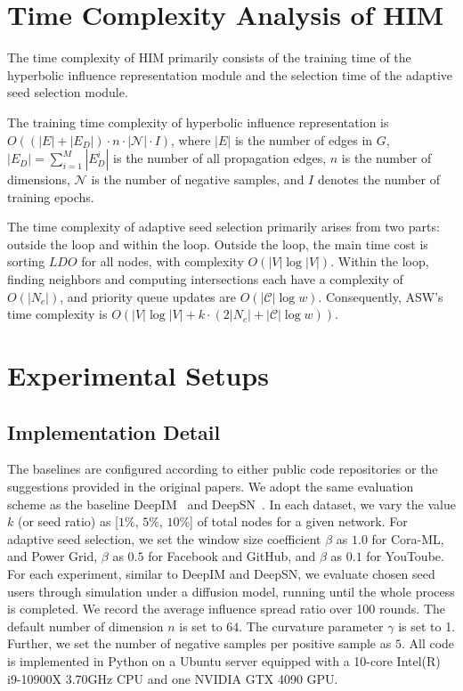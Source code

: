 \appendix

\section{Time Complexity Analysis of HIM}

The time complexity of HIM primarily consists of the training time of the hyperbolic influence representation module and the selection time of the adaptive seed selection module.

The training time complexity of hyperbolic influence representation is $O( (|E|+|E_D|) \cdot n \cdot |\mathcal{N}| \cdot I )$, where $|E|$ is the number of edges in $G$, $|E_D| = \sum_{i=1}^{M}|E^i_D|$ is the number of all propagation edges,
$n$ is the number of dimensions, 
$\mathcal{N}$ is the number of negative samples,
and $I$ denotes the number of training epochs.

The time complexity of adaptive seed selection primarily arises from two parts: outside the loop and within the loop. 
Outside the loop, the main time cost is sorting $LDO$ for all nodes, with complexity $O(|V| \log |V|)$. Within the loop, finding neighbors and computing intersections each have a complexity of $O(|N_c|)$, and priority queue updates are $O( |\mathcal{C}| \log w)$. Consequently, ASW's time complexity is $O(|V| \log |V| + k \cdot (2|N_c|+ |\mathcal{C}| \log w))$.


\section{Experimental Setups}
\label{sec:setup}
\subsection{Implementation Detail}
The baselines are configured according to either public code repositories or the suggestions provided in the original papers.
We adopt the same evaluation scheme as the baseline DeepIM~\cite{ling2023icml} and DeepSN~\cite{hevapathige2024_DeepSN}.
In each dataset, we vary the value $k$ (or seed ratio) as [$1\%$, $5\%$, $10\%$] of total nodes for a given network.
For adaptive seed selection, we set the window size coefficient $\beta$ as $1.0$ for Cora-ML, and Power Grid, $\beta$ as $0.5$ for Facebook and GitHub, and $\beta$ as $0.1$ for YouToube.
For each experiment, similar to DeepIM and DeepSN, 
we evaluate chosen seed users through simulation under a diffusion model, running until the whole process is completed.
We record the average influence spread ratio over 100 rounds.
The default number of dimension $n$ is set to $64$.
The curvature parameter $\gamma$ is set to 1.
Further, we set the number of negative samples per positive sample as $5$.
All code is implemented in Python on a Ubuntu server equipped with a 10-core Intel(R) i9-10900X 3.70GHz CPU and one NVIDIA GTX 4090 GPU.